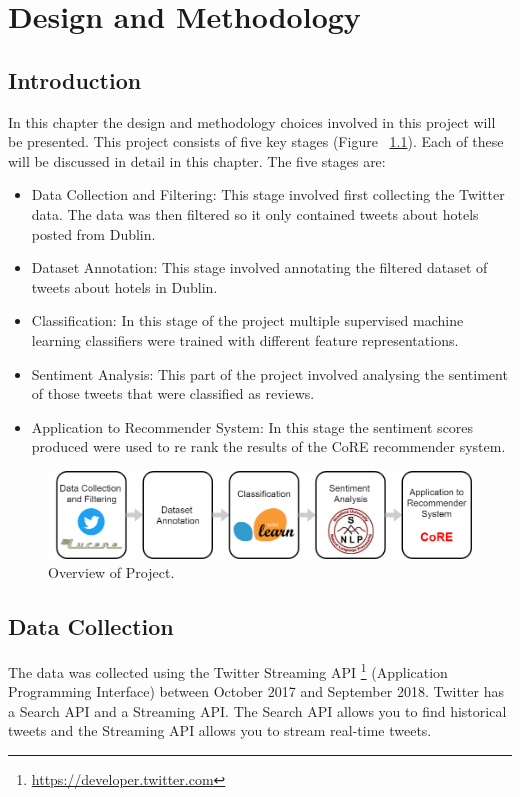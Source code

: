 \chapter{Design and Methodology}

\section{Introduction}

In this chapter the design and methodology choices involved in this project will be presented. This project consists of five key stages (Figure ~\ref{fig:pipeline}). Each of these will be discussed in detail in this chapter. The five stages are:
\begin{itemize}
    \item Data Collection and Filtering: This stage involved first collecting the Twitter data. The data was then filtered so it only contained tweets about hotels posted from Dublin.
    \item Dataset Annotation: This stage involved annotating the filtered dataset of tweets about hotels in Dublin.
    \item Classification: In this stage of the project multiple supervised machine learning classifiers were trained with different feature representations.
    \item Sentiment Analysis: This part of the project involved analysing the sentiment of those tweets that were classified as reviews.
    \item Application to Recommender System: In this stage the sentiment scores produced were used to re rank the results of the CoRE \cite{core2019} recommender system.
\end{itemize}

\begin{figure}[h!]
\centering
\includegraphics[width=1\textwidth]{design_and_methodology/pipeline.png}
\caption{\label{fig:pipeline} Overview of Project.}
\end{figure}

\section{Data Collection}
The data was collected using the Twitter Streaming API \footnote{\url{https://developer.twitter.com}} (Application Programming Interface) between October 2017 and September 2018. Twitter has a Search API and a Streaming API. The Search API allows you to find historical tweets and the Streaming API allows you to stream real-time tweets.

